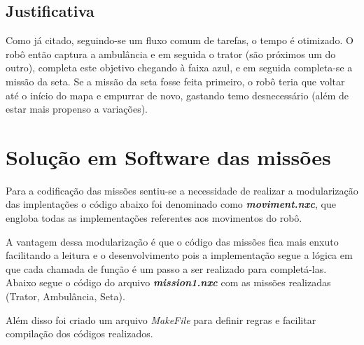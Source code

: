 \section{Justificativa}
Como já citado, seguindo-se um fluxo comum de tarefas, o tempo é otimizado. O robô então captura a ambulância e em seguida o trator (são próximos um do outro), completa este objetivo chegando à faixa azul, e em seguida completa-se a missão da seta. Se a missão da seta fosse feita primeiro, o robô teria que voltar até o início do mapa e empurrar de novo, gastando temo desnecessário (além de estar mais propenso a variações).

\chapter{Solução em Software das missões}

Para a codificação das missões sentiu-se a necessidade de realizar a modularização das implentações o código abaixo foi denominado como \textbf{\textit{moviment.nxc}}, que engloba todas as implementações referentes aos movimentos do robô.



A vantagem dessa modularização é que o código das missões fica mais enxuto facilitando a leitura e o desenvolvimento pois a implementação segue a lógica em que cada chamada de função é um passo a ser realizado para completá-las. Abaixo segue o código do arquivo \textbf{\textit{mission1.nxc}} com as missões realizadas (Trator, Ambulância, Seta).



Além disso foi criado um arquivo \textit{MakeFile} para definir regras e facilitar compilação dos códigos realizados. 




